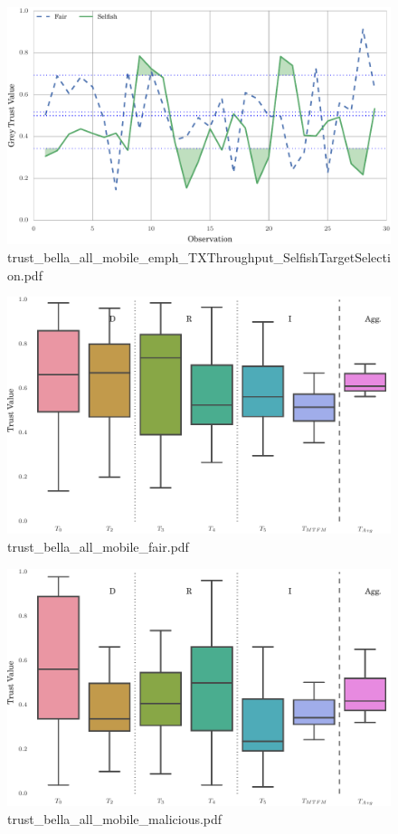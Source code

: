 \documentclass{article}
\begin{document}
\begin{figure}[h!]
\centering
\includegraphics[width=\linewidth]{trust_bella_all_mobile_emph_TXThroughput_SelfishTargetSelection.pdf}
\caption{trust\_bella\_all\_mobile\_emph\_TXThroughput\_SelfishTargetSelection.pdf}
\end{figure}




\begin{figure}[h!]
\centering
\includegraphics[width=\linewidth]{trust_bella_all_mobile_fair.pdf}
\caption{trust\_bella\_all\_mobile\_fair.pdf}
\end{figure}




\begin{figure}[h!]
\centering
\includegraphics[width=\linewidth]{trust_bella_all_mobile_malicious.pdf}
\caption{trust\_bella\_all\_mobile\_malicious.pdf}
\end{figure}
\end{document}
